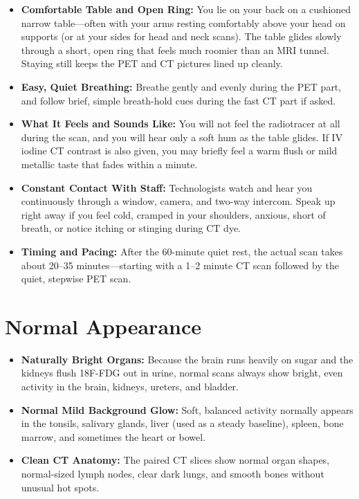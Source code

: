 \begin{itemize}
    \item \textbf{Comfortable Table and Open Ring:} You lie on your back on a cushioned narrow table---often with your arms resting comfortably above your head on supports (or at your sides for head and neck scans). The table glides slowly through a short, open ring that feels much roomier than an MRI tunnel. Staying still keeps the PET and CT pictures lined up cleanly.
    \item \textbf{Easy, Quiet Breathing:} Breathe gently and evenly during the PET part, and follow brief, simple breath-hold cues during the fast CT part if asked.
    \item \textbf{What It Feels and Sounds Like:} You will not feel the radiotracer at all during the scan, and you will hear only a soft hum as the table glides. If IV iodine CT contrast is also given, you may briefly feel a warm flush or mild metallic taste that fades within a minute.
    \item \textbf{Constant Contact With Staff:} Technologists watch and hear you continuously through a window, camera, and two-way intercom. Speak up right away if you feel cold, cramped in your shoulders, anxious, short of breath, or notice itching or stinging during CT dye.
    \item \textbf{Timing and Pacing:} After the 60-minute quiet rest, the actual scan takes about 20--35 minutes---starting with a 1--2 minute CT scan followed by the quiet, stepwise PET scan.
\end{itemize}

\section{Normal Appearance}

\begin{itemize}
    \item \textbf{Naturally Bright Organs:} Because the brain runs heavily on sugar and the kidneys flush 18F-FDG out in urine, normal scans always show bright, even activity in the brain, kidneys, ureters, and bladder.
    \item \textbf{Normal Mild Background Glow:} Soft, balanced activity normally appears in the tonsils, salivary glands, liver (used as a steady baseline), spleen, bone marrow, and sometimes the heart or bowel.
    \item \textbf{Clean CT Anatomy:} The paired CT slices show normal organ shapes, normal-sized lymph nodes, clear dark lungs, and smooth bones without unusual hot spots.
\end{itemize}

